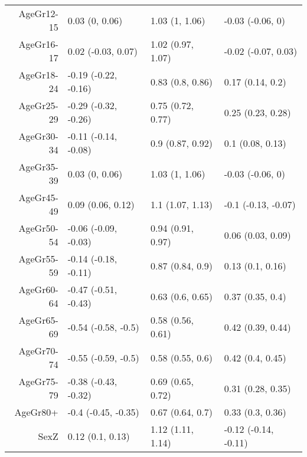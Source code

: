 \begin{table}[ht]
\begin{tabular}{rlll}
  AgeGr12-15 & 0.03 (0, 0.06) & 1.03 (1, 1.06) & -0.03 (-0.06, 0) \\ 
  AgeGr16-17 & 0.02 (-0.03, 0.07) & 1.02 (0.97, 1.07) & -0.02 (-0.07, 0.03) \\ 
  AgeGr18-24 & -0.19 (-0.22, -0.16) & 0.83 (0.8, 0.86) & 0.17 (0.14, 0.2) \\ 
  AgeGr25-29 & -0.29 (-0.32, -0.26) & 0.75 (0.72, 0.77) & 0.25 (0.23, 0.28) \\ 
  AgeGr30-34 & -0.11 (-0.14, -0.08) & 0.9 (0.87, 0.92) & 0.1 (0.08, 0.13) \\ 
  AgeGr35-39 & 0.03 (0, 0.06) & 1.03 (1, 1.06) & -0.03 (-0.06, 0) \\ 
  AgeGr45-49 & 0.09 (0.06, 0.12) & 1.1 (1.07, 1.13) & -0.1 (-0.13, -0.07) \\ 
  AgeGr50-54 & -0.06 (-0.09, -0.03) & 0.94 (0.91, 0.97) & 0.06 (0.03, 0.09) \\ 
  AgeGr55-59 & -0.14 (-0.18, -0.11) & 0.87 (0.84, 0.9) & 0.13 (0.1, 0.16) \\ 
  AgeGr60-64 & -0.47 (-0.51, -0.43) & 0.63 (0.6, 0.65) & 0.37 (0.35, 0.4) \\ 
  AgeGr65-69 & -0.54 (-0.58, -0.5) & 0.58 (0.56, 0.61) & 0.42 (0.39, 0.44) \\ 
  AgeGr70-74 & -0.55 (-0.59, -0.5) & 0.58 (0.55, 0.6) & 0.42 (0.4, 0.45) \\ 
  AgeGr75-79 & -0.38 (-0.43, -0.32) & 0.69 (0.65, 0.72) & 0.31 (0.28, 0.35) \\ 
  AgeGr80+ & -0.4 (-0.45, -0.35) & 0.67 (0.64, 0.7) & 0.33 (0.3, 0.36) \\ 
  SexZ & 0.12 (0.1, 0.13) & 1.12 (1.11, 1.14) & -0.12 (-0.14, -0.11) \\ 
   \hline
\end{tabular}
\end{table}
